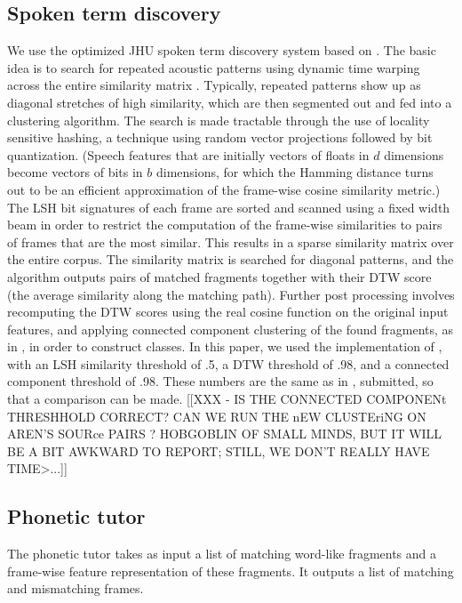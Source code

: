 \documentclass[a4paper]{article}
\begin{document}
\subsection{Spoken term discovery}

We use the optimized JHU spoken term discovery system based on \cite{jansen}. The basic idea is to search for repeated acoustic patterns using dynamic time warping across the entire similarity matrix \cite{park}. Typically, repeated patterns show up as diagonal stretches of high similarity, which are then segmented out and fed into a clustering algorithm. The search is made tractable through the use of locality sensitive hashing, a technique using random vector projections followed by bit quantization. (Speech features that are initially vectors of floats in $d$ dimensions become vectors of bits in $b$ dimensions, for which the Hamming distance turns out to be an efficient approximation of the frame-wise cosine similarity metric.) The LSH bit signatures of each frame are sorted and scanned using a fixed width beam in order to restrict the computation of the frame-wise similarities to pairs of frames that are the most similar. This results in a sparse similarity matrix over the entire corpus. The similarity matrix is searched for diagonal patterns, and the algorithm outputs pairs of matched fragments together with their DTW score (the average similarity along the matching path). Further post processing involves recomputing the DTW scores using the real cosine function on the original input features, and applying connected component clustering of the found fragments, as in \cite{park}, in order to construct classes. In this paper, we used the implementation of \cite{jansen}, with an LSH similarity threshold of .5, a DTW threshold of .98, and a connected component threshold of .98. These numbers are the same as in \cite{XXX}, submitted, so that a comparison can be made.  [[XXX - IS THE CONNECTED COMPONENt THRESHHOLD CORRECT? CAN WE RUN THE nEW CLUSTEriNG ON AREN'S SOURce PAIRS ? HOBGOBLIN OF SMALL MINDS, BUT IT WILL BE A BIT AWKWARD TO REPORT; STILL, WE DON'T REALLY HAVE TIME>...]]

\subsection{Phonetic tutor}

The phonetic tutor takes as input a list of matching word-like fragments and a frame-wise feature representation of these fragments. It outputs a list of matching and mismatching frames.
\end{document}
